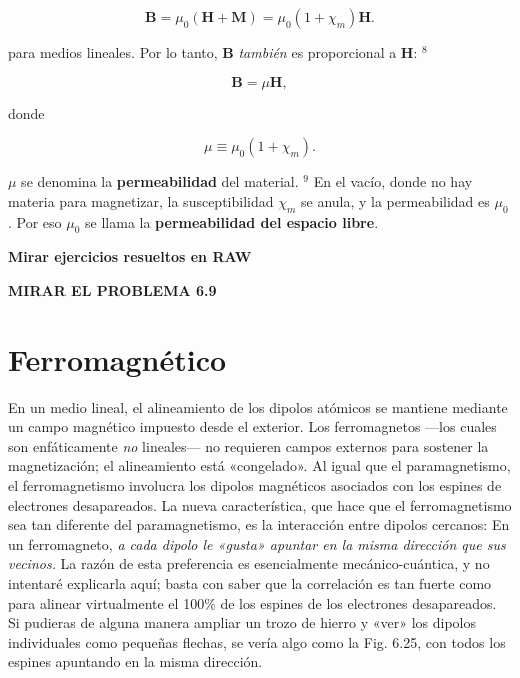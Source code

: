 \documentclass[12pt,a4paper]{report}
\newcommand{\esp}{\vspace{0.5cm}}
\begin{document}
	\begin{equation}
		\mathbf{B} = \mu_0(\mathbf{H} + \mathbf{M}) = \mu_0(1 + \chi_m)\mathbf{H}. \tag{6.30}
	\end{equation}
	
	\noindent para medios lineales. Por lo tanto, $\mathbf{B}$ \textit{también} es proporcional a $\mathbf{H}$: $^8$
	
	\begin{equation}
		\mathbf{B} = \mu \mathbf{H}, \tag{6.31}
	\end{equation}
	
	\noindent donde
	
	\begin{equation}
		\mu \equiv \mu_0(1 + \chi_m). \tag{6.32}
	\end{equation}
	
	$\mu$ se denomina la \textbf{permeabilidad} del material. $^9$ En el vacío, donde no hay materia para magnetizar, la susceptibilidad $\chi_m$ se anula, y la permeabilidad es $\mu_0$. Por eso $\mu_0$ se llama la \textbf{permeabilidad del espacio libre}.
	
	\esp
	
	\noindent \textbf{Mirar ejercicios resueltos en RAW}
	
	\esp
	
	\noindent \textbf{MIRAR EL PROBLEMA 6.9}
	
	\esp
	
	\section{Ferromagnético}
	
	En un medio lineal, el alineamiento de los dipolos atómicos se mantiene mediante un campo magnético impuesto desde el exterior. Los ferromagnetos —los cuales son enfáticamente \textit{no} lineales— no requieren campos externos para sostener la magnetización; el alineamiento está «congelado». Al igual que el paramagnetismo, el ferromagnetismo involucra los dipolos magnéticos asociados con los espines de electrones desapareados. La nueva característica, que hace que el ferromagnetismo sea tan diferente del paramagnetismo, es la interacción entre dipolos cercanos: En un ferromagneto, \textit{a cada dipolo le «gusta» apuntar en la misma dirección que sus vecinos.} La razón de esta preferencia es esencialmente mecánico-cuántica, y no intentaré explicarla aquí; basta con saber que la correlación es tan fuerte como para alinear virtualmente el 100\% de los espines de los electrones desapareados. Si pudieras de alguna manera ampliar un trozo de hierro y «ver» los dipolos individuales como pequeñas flechas, se vería algo como la Fig. 6.25, con todos los espines apuntando en la misma dirección.
	
\end{document}
